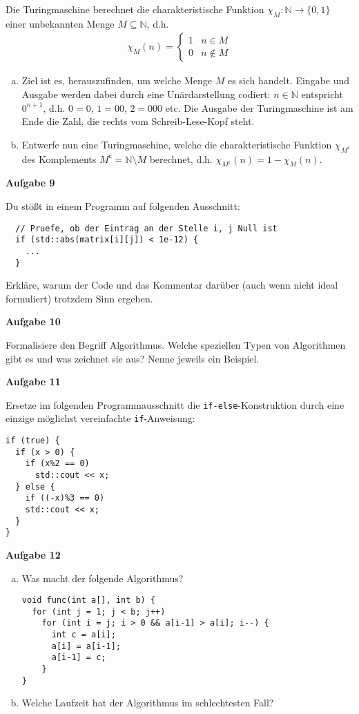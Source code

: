 \documentclass[a4paper,12pt]{article}
\newcommand{\Aufgabe}[1]{
  {
    \vspace*{0.5cm}
    \textsf{\textbf{Aufgabe #1}}
    \vspace*{0.2cm}
    
  }
}
\begin{document}
Die Turingmaschine berechnet die charakteristische Funktion $\chi_M : \mathbb{N} \rightarrow \{0,1\}$ einer unbekannten Menge $M \subseteq \mathbb{N}$, d.h.
\begin{align*}
  \chi_M(n) =
  \begin{cases}
    1 & n \in M \\
    0 & n \not\in M
  \end{cases}
\end{align*}
\begin{enumerate}[a)]
\item Ziel ist es, herauszufinden, um welche Menge $M$ es sich handelt. Eingabe und Ausgabe werden dabei durch eine Unärdarstellung codiert: $n \in \mathbb{N}$ entspricht $0^{n+1}$, d.h. $0 = 0$, $1 = 00$, $2=000$ etc. Die Ausgabe der Turingmaschine ist am Ende die Zahl, die rechts vom Schreib-Lese-Kopf steht.
\item Entwerfe nun eine Turingmaschine, welche die charakteristische Funktion $\chi_{M^{\mathsf{c}}}$ des Komplements $M^{\mathsf{c}} = \mathbb{N} \setminus M$ berechnet, d.h. $ \chi_{M^{\mathsf{c}}}(n) = 1 - \chi_M(n)  $.
\end{enumerate}
\Aufgabe{9}
Du stößt in einem Programm auf folgenden Ausschnitt:
\begin{lstlisting}
  // Pruefe, ob der Eintrag an der Stelle i, j Null ist
  if (std::abs(matrix[i][j]) < 1e-12) {
    ...
  }
\end{lstlisting}
Erkläre, warum der Code und das Kommentar darüber (auch wenn nicht ideal formuliert) trotzdem Sinn ergeben.

\Aufgabe{10}
Formalisiere den Begriff Algorithmus. Welche speziellen Typen von Algorithmen gibt es und was zeichnet sie aus? Nenne jeweils ein Beispiel.

\Aufgabe{11}
Ersetze im folgenden Programmausschnitt die \lstinline{if-else}-Konstruktion durch eine einzige möglichst vereinfachte \lstinline{if}-Anweisung:
\begin{lstlisting}
if (true) {
  if (x > 0) {
    if (x%2 == 0)
      std::cout << x;
  } else {
    if ((-x)%3 == 0)
    std::cout << x;
  }
}
\end{lstlisting}

\Aufgabe{12}
\begin{enumerate}[a)]
\item 
  Was macht der folgende Algorithmus?
  \begin{lstlisting}
void func(int a[], int b) {
  for (int j = 1; j < b; j++)
    for (int i = j; i > 0 && a[i-1] > a[i]; i--) {
      int c = a[i];
      a[i] = a[i-1];
      a[i-1] = c;
    }
}
  \end{lstlisting}
\item Welche Laufzeit hat der Algorithmus im schlechtesten Fall?
\end{enumerate}
\end{document}
